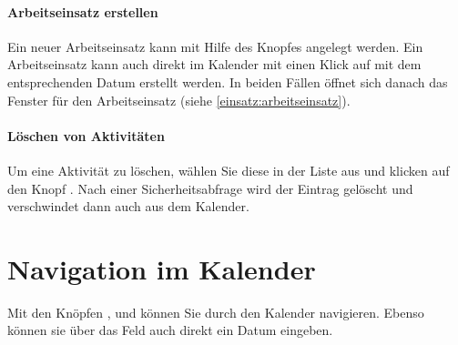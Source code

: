 \paragraph{Arbeitseinsatz erstellen}
Ein neuer Arbeitseinsatz kann mit Hilfe des Knopfes  angelegt werden.
Ein Arbeitseinsatz kann auch direkt im Kalender mit einen Klick auf \button{+} mit dem entsprechenden Datum erstellt werden.
In beiden Fällen öffnet sich danach das Fenster für den Arbeitseinsatz
(siehe \cref{einsatz:arbeitseinsatz}).




\paragraph{Löschen von Aktivitäten}
Um eine Aktivität zu löschen, wählen Sie diese in der Liste aus
und klicken auf den Knopf .
Nach einer Sicherheitsabfrage wird der Eintrag gelöscht und verschwindet dann auch aus dem Kalender.



\section{Navigation im Kalender}\label{einsatz:kalender:navigieren}
Mit den Knöpfen ,  und  können Sie durch den Kalender navigieren.
Ebenso können sie über das Feld auch direkt ein Datum eingeben.



